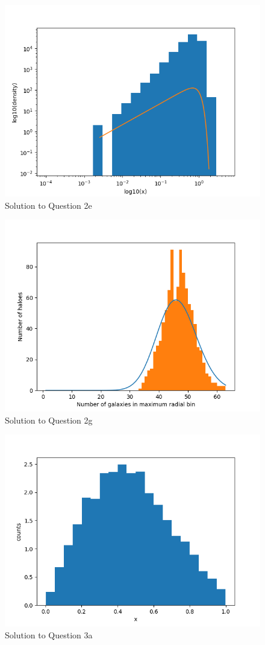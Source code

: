 \begin{figure}[h!]
  \centering
  \includegraphics[width=0.9\linewidth]{./plots/Density_profile_Haloes_Log-Log2.png}
  \caption{Solution to Question 2e}
  \label{fig:fig3}
\end{figure}

\begin{figure}[h!]
  \centering
  \includegraphics[width=0.9\linewidth]{./plots/Counts_of_bins.png}
  \caption{Solution to Question 2g}
  \label{fig:fig4}
\end{figure}

\begin{figure}[h!]
  \centering
  \includegraphics[width=0.9\linewidth]{./plots/Densityprofile_readin_gal.png}
  \caption{Solution to Question 3a}
  \label{fig:fig5}
\end{figure}
